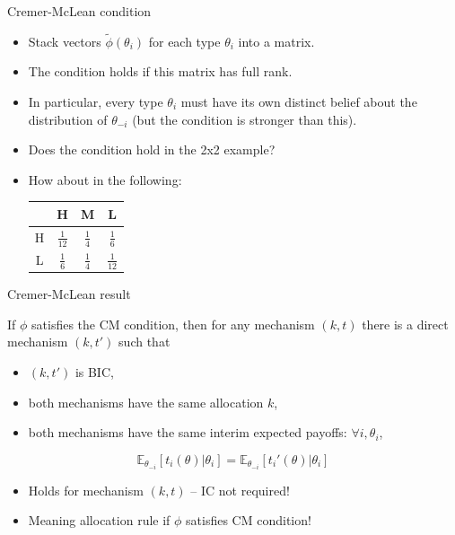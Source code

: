 \documentclass[english,10pt
,aspectratio=169
]{beamer}
\begin{document}
\begin{frame}{Cremer-McLean condition}
\begin{itemize}
	\item Stack vectors $\tilde\phi(\theta_i)$ for each type $\theta_i$ into a matrix.
	\item The condition holds if this matrix has full rank.
	\item In particular, every type $\theta_i$ must have its own distinct belief about the distribution of $\theta_{-i}$ (but the condition is stronger than this).
	\item Does the condition hold in the 2x2 example?
	\item How about in the following:
	\begin{example}[2x3]
		\begin{center}
			\begin{tabular}{c | c | c | c |}
					& H 				& M				& L					\\ \hline
				H	& $\frac{1}{12}$ 	& $\frac{1}{4}$ & $\frac{1}{6}$ 	\\ \hline
				L	& $\frac{1}{6}$ 	& $\frac{1}{4}$ & $\frac{1}{12}$		\\ \hline
			\end{tabular}
		\end{center}
	\end{example}
\end{itemize}
\end{frame}


\begin{frame}{Cremer-McLean result}
\begin{theorem}
	If $\phi$ satisfies the CM condition, then for any mechanism $(k,t)$ there is a direct mechanism $(k,t')$ such that
	\begin{itemize}
		\item $(k,t')$ is \alert{BIC},
		\item both mechanisms have the same allocation $k$,
		\item both mechanisms have the same interim expected payoffs: $\forall i,\theta_i$,
	\end{itemize}
	\begin{equation*}
		\mathbb{E}_{\theta_{-i}} \left[ t_i(\theta) | \theta_i \right] = \mathbb{E}_{\theta_{-i}} \left[ t_i'(\theta) | \theta_i \right]
	\end{equation*}
\end{theorem}
\begin{itemize}
	\item Holds for  mechanism $(k,t)$ -- IC not required!
	\item Meaning  allocation rule  if $\phi$ satisfies CM condition!
\end{itemize}
\end{frame}
\end{document}
